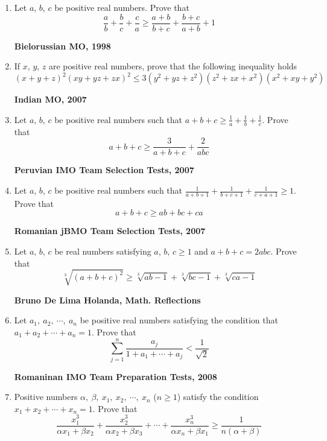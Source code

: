 \documentclass{article}
\begin{document}
\begin{enumerate}
\item Let $a$, $b$, $c$ be positive real numbers. Prove that $$\frac{a}{b}+ \frac{b}{c} + \frac{c}{a} \geq \frac{a+b}{b+c} +\frac{b+c}{a+b} +1$$
\begin {flushright}
\textbf{Bielorussian MO, 1998}
\end{flushright}
\item If $x $, $y $, $z $ are positive real numbers, prove that the following inequality holds $$(x+y+z)^2(xy+yz+zx)^2\leq 3 (y^2+yz+z^2)(z^2+zx+x^2)(x^2+xy+y^2)$$
\begin {flushright}
\textbf{Indian MO, 2007}
\end{flushright}
\item Let $a$, $b$, $c$ be positive real numbers such that $a+b+c \geq \displaystyle {\frac{1}{a}+ \frac{1}{b}+\frac{1}{c}}$. Prove that $$a+b+c \geq \frac{3}{a+b+c}+ \frac{2}{abc}$$
\begin {flushright}
\textbf{Peruvian IMO Team Selection Tests, 2007}
\end{flushright}
\item Let $a$, $b$, $c$ be positive real numbers such that $\displaystyle{\frac{1}{a+b+1} +\frac{1}{b+c+1} +\frac{1}{c+a+1} \geq 1}$. Prove that $$a+b+c \geq ab+bc+ca$$
\begin {flushright}
\textbf{Romanian jBMO Team Selection Tests, 2007}
\end{flushright}
\item Let $a$, $b$, $c$ be real numbers satisfying  $a$, $b $, $c \geq 1$ and $a+b+c =2abc $. Prove that $$\sqrt [3]{(a+b+c)^2} \geq \sqrt [3]{ab-1}+ \sqrt [3]{bc-1}+ \sqrt [3]{ca-1}$$
\begin {flushright}
\textbf{Bruno De Lima Holanda, Math. Reflections}
\end{flushright}
\item Let $a_1,\ a_2,\ \cdots, \ a_n $ be positive real numbers satisfying the condition that  $a_1+a_2+\cdots+a_n=1$. Prove that $$\sum \limits_{j=1}^n \frac{a_j}{1+a_1+\cdots + a_j}< \frac{1}{\sqrt {2}}$$
\begin {flushright}
\textbf{Romaninan IMO Team Preparation Tests, 2008}
\end{flushright}
\item Positive numbers $\alpha ,\ \beta,\ x_1,\ x_2,\ \cdots,\ x_n$ ($n\geq 1$) satisfy the condition  $x_1+x _2+\cdots + x_n=1$. Prove that $$\frac {x_1^3}{\alpha x_1+ \beta x_2} + \frac {x_2^3}{\alpha x_2+ \beta x_3} + \cdots + \frac {x_n^3}{\alpha x_n+ \beta x_1} \geq \frac {1}{n (\alpha + \beta )}$$
\begin {flushright}

\end{flushright}
\end{enumerate}
\end{document}
